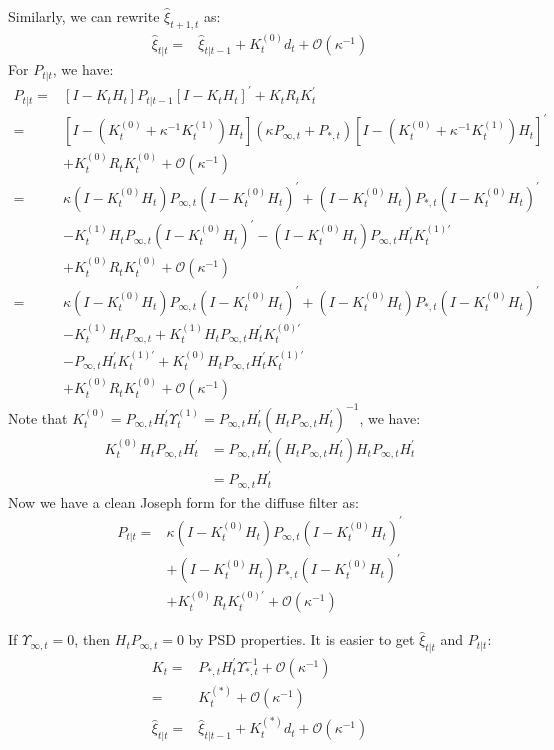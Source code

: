 \documentclass[12pt]{article}
\numberwithin{equation}{section}
\begin{document}
Similarly, we can rewrite $\hat{\xi}_{t+1,t}$ as:
\begin{align}
    \hat{\xi}_{t|t} =& \hat{\xi}_{t|t-1} + K_t^{(0)}d_t + \mathcal{O}(\kappa^{-1}) \label{eq:diff_xi1} 
\end{align}
For $P_{t|t}$, we have:
\begin{align*}
    P_{t|t} =& [I-K_tH_t]P_{t|t-1}[I-K_tH_t]^{'}+K_tR_tK_t^{'} \\
    =& [I-(K_t^{(0)}+\kappa^{-1}K_t^{(1)})H_t](\kappa P_{\infty,t}+P_{*,t})[I-(K_t^{(0)}+\kappa^{-1}K_t^{(1)})H_t]^{'} \\ 
    &+ K_t^{(0)}R_tK_t^{(0)} + \mathcal{O}(\kappa^{-1}) \\
    =& \kappa(I-K_t^{(0)}H_t)P_{\infty,t}(I-K_t^{(0)}H_t)^{'} + (I-K_t^{(0)}H_t)P_{*,t}(I-K_t^{(0)}H_t)^{'} \\
    &-K_t^{(1)}H_tP_{\infty,t}(I-K_t^{(0)}H_t)^{'} - (I-K_t^{(0)}H_t)P_{\infty,t}H_t^{'}K_t^{(1)'} \\
    &+ K_t^{(0)}R_tK_t^{(0)} + \mathcal{O}(\kappa^{-1}) \\
    =& \kappa(I-K_t^{(0)}H_t)P_{\infty,t}(I-K_t^{(0)}H_t)^{'} + (I-K_t^{(0)}H_t)P_{*,t}(I-K_t^{(0)}H_t)^{'} \\
    &-K_t^{(1)}H_tP_{\infty,t} + K_t^{(1)}H_tP_{\infty,t}H_t^{'}K_t^{(0)'} \\
    &- P_{\infty,t}H_t^{'}K_t^{(1)'} + K_t^{(0)}H_tP_{\infty,t}H_t^{'}K_t^{(1)'}  \\
    &+ K_t^{(0)}R_tK_t^{(0)} + \mathcal{O}(\kappa^{-1}) 
\end{align*}
Note that $K_t^{(0)} = P_{\infty,t}H_t^{'}\Upsilon_t^{(1)} = P_{\infty,t}H_t^{'}(H_tP_{\infty,t}H_t^{'})^{-1}$, we have:
\begin{align*}
    K_t^{(0)}H_tP_{\infty,t}H_t^{'} &= P_{\infty,t}H_t^{'}(H_tP_{\infty,t}H_t^{'})H_tP_{\infty,t}H_t^{'} \\
    &= P_{\infty,t}H_t^{'}
\end{align*}
Now we have a clean Joseph form for the diffuse filter as:
\begin{align}
    P_{t|t}=& \kappa (I-K_t^{(0)}H_t)P_{\infty,t}(I-K_t^{(0)}H_t)^{'} \label{eq:diff_P1} \\
    &+(I-K_t^{(0)}H_t)P_{*,t}(I-K_t^{(0)}H_t)^{'} \nonumber \\
    &+K_t^{(0)}R_tK_t^{(0)'} + \mathcal{O}(\kappa^{-1}) \nonumber
\end{align}

If $\Upsilon_{\infty,t}=0$, then $H_tP_{\infty,t}=0$ by PSD properties. It is easier to get $\hat{\xi}_{t|t}$ and $P_{t|t}$:
\begin{align}
    K_t =& P_{*,t}H_t^{'}\Upsilon_{*,t}^{-1} + \mathcal{O}(\kappa^{-1}) \nonumber \\
    =& K_t^{(*)} + \mathcal{O}(\kappa^{-1}) \label{eq:K2_diffuse} \\
    \hat{\xi}_{t|t} =& \hat{\xi}_{t|t-1} + K_t^{(*)}d_t + \mathcal{O}(\kappa^{-1}) \label{eq:diff_xi2} 
\end{align}
\end{document}
